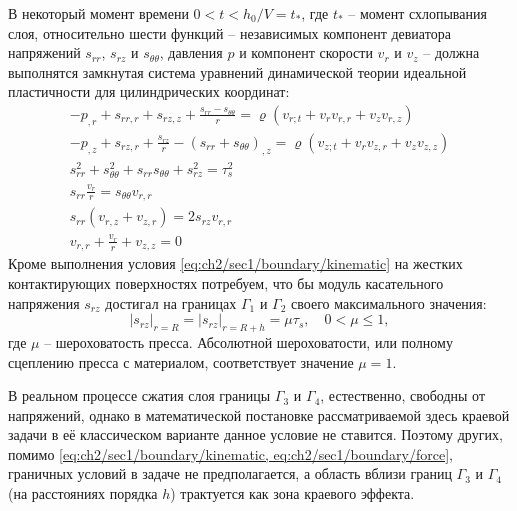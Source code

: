 В некоторый момент времени $0 < t < h_{0}/V = t_*$, где $t_*$ -- момент схлопывания слоя, относительно шести функций -- независимых компонент девиатора напряжений $s_{rr}$, $s_{rz}$ и $s_{\theta\theta}$, давления $p$ и компонент скорости $v_{r}$ и $v_{z}$ -- должна выполнятся замкнутая система уравнений динамической теории идеальной пластичности для цилиндрических координат:
\begin{subequations}
  \label{eqs:ch2/sec1/general}
  \begin{gather}
    \label{eqs:ch2/sec1/general/motion:1}
    -p_{,r}+s_{rr,r}+s_{rz,z}+\frac{s_{rr}-s_{\theta\theta}}{r} = \varrho \left(v_{r;t}+v_{r} v_{r,r} + v_{z} v_{r,z} \right)
    \\
    \label{eqs:ch2/sec1/general/motion:2}
    -p_{,z}+s_{rz,r}+\frac{s_{rz}}{r}-(s_{rr}+s_{\theta\theta})_{,z} = \varrho \left(v_{z;t}+v_{r} v_{z,r} + v_{z} v_{z,z} \right)
    \\
    \label{eqs:ch2/sec1/general/plasticity}
    s^2_{rr}+s^2_{\theta\theta}+s_{rr} s_{\theta\theta} + s^2_{rz}=\tau^2_{s}
    \\
    \label{eqs:ch2/sec1/general/coax:1}
    s_{rr} \frac{v_{r}}{r} = s_{\theta\theta} v_{r,r}
    \\
    \label{eqs:ch2/sec1/general/coax:2}
    s_{rr} (v_{r,z}+v_{z,r}) = 2 s_{rz} v_{r,r}
    \\
    \label{eqs:ch2/sec1/general/uncompress}
    v_{r,r}+\frac{v_{r}}{r}+v_{z,z} = 0
  \end{gather}
\end{subequations}
Кроме выполнения условия \cref{eq:ch2/sec1/boundary/kinematic} на жестких контактирующих поверхностях потребуем, что бы модуль касательного напряжения $s_{rz}$ достигал на границах $\Gamma_{1}$ и $\Gamma_{2}$ своего максимального значения:
\begin{equation}
  \label{eq:ch2/sec1/boundary/force}
  \lvert s_{rz}\lvert_{r=R} = \lvert s_{rz}\lvert_{r=R+h} = \mu \tau_{s}, \quad 0 < \mu \le 1,
\end{equation}
где $\mu$ -- шероховатость пресса. Абсолютной шероховатости, или полному сцеплению пресса с материалом, соответствует значение $\mu = 1$.

В реальном процессе сжатия слоя границы $\Gamma_{3}$ и $\Gamma_{4}$, естественно, свободны от напряжений, однако в математической постановке рассматриваемой здесь краевой задачи в её классическом варианте данное условие не ставится. Поэтому других, помимо \cref{eq:ch2/sec1/boundary/kinematic, eq:ch2/sec1/boundary/force}, граничных условий в задаче не предполагается, а область вблизи границ $\Gamma_{3}$ и $\Gamma_{4}$(на расстояниях порядка $h$) трактуется как зона краевого эффекта.

